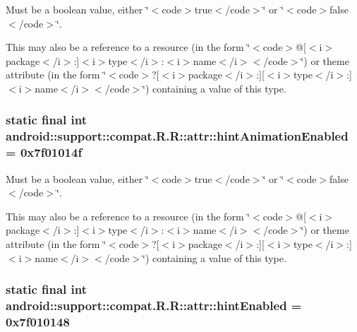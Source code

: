 Must be a boolean value, either \char`\"{}$<$code$>$true$<$/code$>$\char`\"{} or \char`\"{}$<$code$>$false$<$/code$>$\char`\"{}. 

This may also be a reference to a resource (in the form \char`\"{}$<$code$>$@\mbox{[}$<$i$>$package$<$/i$>$:\mbox{]}$<$i$>$type$<$/i$>$:$<$i$>$name$<$/i$>$$<$/code$>$\char`\"{}) or theme attribute (in the form \char`\"{}$<$code$>$?\mbox{[}$<$i$>$package$<$/i$>$:\mbox{]}\mbox{[}$<$i$>$type$<$/i$>$:\mbox{]}$<$i$>$name$<$/i$>$$<$/code$>$\char`\"{}) containing a value of this type. \hypertarget{classandroid_1_1support_1_1compat_1_1_r_1_1attr_95e7545a4d482e57e72c0ad8de853e84}{
\subsubsection[{hintAnimationEnabled}]{\setlength{\rightskip}{0pt plus 5cm}static final int android::support::compat.R.R::attr::hintAnimationEnabled = 0x7f01014f}}
\label{classandroid_1_1support_1_1compat_1_1_r_1_1attr_95e7545a4d482e57e72c0ad8de853e84}


Must be a boolean value, either \char`\"{}$<$code$>$true$<$/code$>$\char`\"{} or \char`\"{}$<$code$>$false$<$/code$>$\char`\"{}. 

This may also be a reference to a resource (in the form \char`\"{}$<$code$>$@\mbox{[}$<$i$>$package$<$/i$>$:\mbox{]}$<$i$>$type$<$/i$>$:$<$i$>$name$<$/i$>$$<$/code$>$\char`\"{}) or theme attribute (in the form \char`\"{}$<$code$>$?\mbox{[}$<$i$>$package$<$/i$>$:\mbox{]}\mbox{[}$<$i$>$type$<$/i$>$:\mbox{]}$<$i$>$name$<$/i$>$$<$/code$>$\char`\"{}) containing a value of this type. \hypertarget{classandroid_1_1support_1_1compat_1_1_r_1_1attr_79582c6339946cc7eaf6f891b948ec90}{
\subsubsection[{hintEnabled}]{\setlength{\rightskip}{0pt plus 5cm}static final int android::support::compat.R.R::attr::hintEnabled = 0x7f010148}}
\label{classandroid_1_1support_1_1compat_1_1_r_1_1attr_79582c6339946cc7eaf6f891b948ec90}


